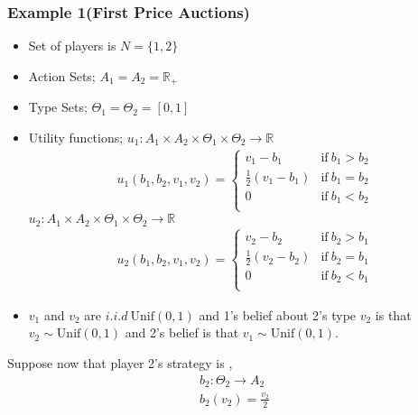 \documentclass[12pt,a4paper]{article}
\begin{document}
 \subsubsection{Example 1(First Price Auctions)} 
\begin{itemize}
    \item Set of players is \(N=\{1,2\}\)
  
    \item Action Sets; \(A_{1}=A_{2}=\mathbb{R}_{+}\)
    
    \item Type Sets; \(\Theta_{1}=\Theta_{2}=[0,1]\)
    
    \item Utility functions; \(u_{1}:A_{1} \times A_{2} \times \Theta_{1} \times \Theta_{2} \to \mathbb{R}\) 
    \begin{align*}
        u_{1}(b_{1},b_{2},v_{1},v_{2})=
        \begin{cases}
          v_{1}-b_{1} & \text{if} \ b_{1}>b_{2} \\
          \frac{1}{2}(v_{1}-b_{1}) & \text{if} \ b_{1}=b_{2}\\
          0 & \text{if} \ b_{1}<b_{2}\\
        \end{cases}
    \end{align*}
    \(u_{2}:A_{1} \times A_{2} \times \Theta_{1} \times \Theta_{2} \to \mathbb{R}\) 
    \begin{align*}
        u_{2}(b_{1},b_{2},v_{1},v_{2})=
        \begin{cases}
          v_{2}-b_{2} & \text{if} \ b_{2}>b_{1} \\
          \frac{1}{2}(v_{2}-b_{2}) & \text{if} \ b_{2}=b_{1}\\
          0 & \text{if} \ b_{2}<b_{1}\\
        \end{cases}
    \end{align*}
    \item  \(v_{1}\) and \(v_{2}\) are \(i.i.d \ \text{Unif}(0,1)\) and 1's belief about 2's type \(v_{2}\) is that \(v_{2} \sim \text{Unif}(0,1)\) and 2's belief is that \(v_{1} \sim \text{Unif}(0,1)\).
\end{itemize}

Suppose now that player 2's strategy is \(\), 
\begin{align*}
    b_{2}: \Theta_{2} \to A_{2}\\
    b_{2}(v_{2})=\frac{v_{2}}{2}
\end{align*} 
\end{document}
